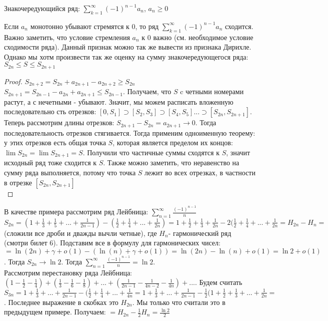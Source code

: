 
Знакочередующийся ряд: $\sum_{k=1}^{\infty} (-1)^{n-1}a_n$, $a_n \ge 0$

\begin{theorem}\thmslashn

Если $a_n$ монотонно убывают стремятся к 0, то ряд $\sum_{k=1}^{\infty} (-1)^{n-1}a_n$ сходится. Важно заметить, что условие стремления $a_n$ к 0 важно (см. необходимое условие сходимости ряда). Данный признак можно так же вывести из признака Дирихле. Однако мы хотм произвести так же оценку на сумму знакочередующегося ряда: $S_{2n} \le S \le S_{2n+1}$
\end{theorem}

\begin{proof}\thmslashn

$S_{2n+2}=S_{2n}+a_{2n+1}-a_{2n+2} \ge S_{2n}$
 $S_{2n+1}=S_{2n-1}-a_{2n}+a_{2n+1} \le S_{2n-1}$. Получаем, что $S$ c четными номерами растут, а с нечетными - убывают. Значит, мы можем расписать вложенную последовательно	сть отрезков: $[0,S_1] \supset [S_2,S_3] \supset [S_4,S_5]... \supset [S_{2n}, S_{2n+1}]$.\\ Теперь рассмотрим длины отрезков: $S_{2n+1}-S_{2n}=a_{2n+1} \to 0$. Тогда последовательность отрезков стягивается. Тогда применим одноименную теорему: у этих отрезков есть общая точка $S$, которая является пределом их концов: $\lim S_{2n} = \lim S_{2n+1} = S$. Получили что частичные суммы сходятся к $S$, значит исходный ряд тоже сходится к $S$. Также можно заметить, что неравенство на сумму ряда выполняется, потому что точка  $S$ лежит во всех отрезках, в частности в отрезке $[S_{2n}, S_{2n+1}]$\\
\end{proof}

\begin{example}\thmslashn

 В качестве примера рассмотрим ряд Лейбница: $\sum_{n=1}^\infty \frac{(-1)^{n-1}}{n} $ \\
 $S_{2n} = (1+ \frac{1}{3} + \frac{1}{5} + ... + \frac{1}{2n-1})-(\frac{1}{2}+ \frac{1}{4}+... + \frac{1}{2n}) = 1+ \frac{1}{2}+ \frac{1}{3}+ \frac{1}{2n} -2(\frac{1}{2}+\frac{1}{4}+...+ \frac{1}{2n}=H_{2n}-H_n=$ (сложили все дроби и дважды вычли четные), где $H_n$- гармонический ряд (смотри билет 6). Подставим все в формулу для гармонических чисел: $=\ln(2n)+ \gamma +o(1)-(\ln(n) + \gamma + o(1)) = \ln(2n) - \ln(n) + o(1) = \ln 2 + o(1)$. Тогда $S_{2n} \to \ln 2$. Тогда $\sum_{n=1}^\infty \frac{(-1)^{n-1}}{n}= \ln 2 $. \\
 Рассмотрим перестановку ряда Лейбница: $(1-\frac{1}{2}-\frac{1}{4})+(\frac{1}{3}-\frac{1}{6}-\frac{1}{8})+...+(\frac{1}{2n-1}-\frac{1}{4n-2}-\frac{1}{4n})+...$.
Будем считать $S_{3n} = 1+\frac{1}{3} + ... +\frac{1}{2n-1} -(\frac{1}{2}+\frac{1}{4}+...+\frac{1}{4n} = 1+\frac{1}{3} + ... +\frac{1}{2n-1} -\frac{1}{2}(1+\frac{1}{2}+\frac{1}{3}+...+\frac{1}{2n}=$. Последнее выражение в скобках это $H_{2n}$. Мы только что считали это в предыдущем примере. Получаем: $=H_{2n}-\frac{1}{2}H_n=\frac{\ln 2}{2}$
\end{example}
